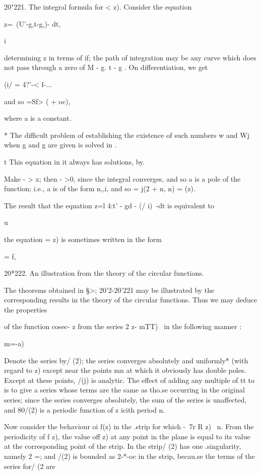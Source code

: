 {20"221. The integral formula for < z). Consider the equation

z=\ (U'-g,t-g,)- dt,

  i

determining z in terms of if; the path of integration may be any
curve which does not pass through a zero of M - g. t - g . On
differentiation, we get

(i/ = 4?'-< f-...

and so =Sf> ( + oc),

where a is a constant.

* The difficult problem of establishing the existence of such numbers
w and Wj when g and g are given is solved in .

t This equation in it always has solutions, by.

%
%

Make - > x; then - >0, since the integral converges, and so a is a
pole of the function; i.e., a is of the form n,,i, and so = j(2 + n,
n) = (z).

The result that the equation z=l 4:t' - gd - (/ i)~-dt is equivalent
to

u

the equation = z) is sometimes written in the form

= f,

20*222. An illustration from the theory of the circular functions.

The theorems obtained in §>; 20'2-20'221 may be illustrated by the
corresponding results in the theory of the circular functions. Thus we
may deduce the properties

of the function cosec- z from the series 2 z- mTT)~ in the following
manner :

m=-a)

Denote the series by/ (2); the series converges absolutely and
uniformly* (with regard to z) except near the points mn at which it
obviously has double poles. Except at these points, /(j) is analytic.
The effect of adding any multiple of tt to is to give a series whose
terms are the same as tho.se occurring in the original series; since
the series converges absolutely, the sum of the series is unaffected,
and 80/(2) is a periodic function of z icith period n.

Now consider the behaviour oi f(z) in the .strip for which -\ 7r R z)
\ n. From the periodicity of f z), the value off z) at any point in
the plane is equal to its value at the corresponding point of the
strip. In the strip/ (2) has one .singularity, namely 2 =; and /(2)
is bounded as 2-*-oc in the strip, becau.se the terms of the series
for/ (2 are

}
